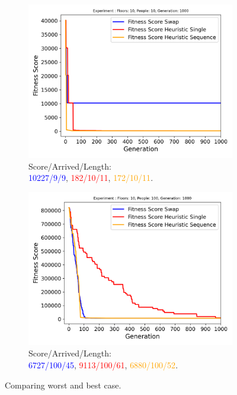 \begin{figure}[ht]
	\centering
	\begin{subfigure}[b]{0.49\linewidth}
		\centering
		\includegraphics[width=\linewidth]{results/Building_Small/Mutation_0.1/Floors__10,_People__10,_Generation__1000_worst.png}
		\captionsetup{justification=centering,font=tiny}
		\caption{Score/Arrived/Length:\\\textcolor{blue}{10227/9/9}, \textcolor{red}{182/10/11}, \textcolor{orange}{172/10/11}.}
		\label{fig:Building Small worst}
	\end{subfigure}
	\hfill
	\begin{subfigure}[b]{0.49\linewidth}
		\centering
		\includegraphics[width=\linewidth]{results/Building_Small/Mutation_0.1/Floors__10,_People__100,_Generation__1000.png}
		\captionsetup{justification=centering,font=tiny}
		\caption{Score/Arrived/Length:\\\textcolor{blue}{6727/100/45}, \textcolor{red}{9113/100/61}, \textcolor{orange}{6880/100/52}.}
		\label{fig:Building Small 100 people}
	\end{subfigure}
	\captionsetup{font=scriptsize}
	\caption{Comparing worst and best case.}
	\label{fig:Building Small results}
\end{figure}


